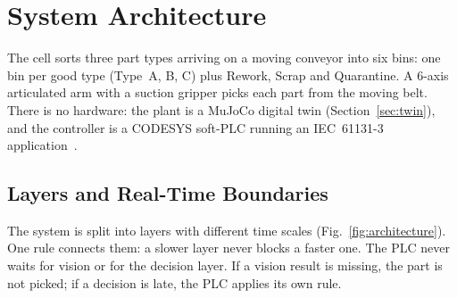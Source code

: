\section{System Architecture}\label{sec:architecture}

The cell sorts three part types arriving on a moving conveyor into six bins: one bin per good
type (Type~A, B, C) plus Rework, Scrap and Quarantine. A 6-axis articulated arm with a suction
gripper picks each part from the moving belt. There is no hardware: the plant is a MuJoCo
digital twin (Section~\ref{sec:twin}), and the controller is a CODESYS soft-PLC running an
IEC~61131-3 application~\cite{IEC61131-3}.

\subsection{Layers and Real-Time Boundaries}

The system is split into layers with different time scales (Fig.~\ref{fig:architecture}). One
rule connects them: a slower layer never blocks a faster one. The PLC never waits for vision or
for the decision layer. If a vision result is missing, the part is not picked; if a decision is
late, the PLC applies its own rule.

